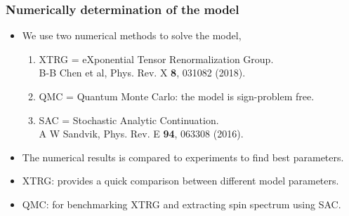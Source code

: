\documentclass[xcolor=table, aspectratio=1610,ignorenonframetext]{beamer}
\begin{document}
\begin{frame}
  \frametitle{Numerically determination of the model}
  \begin{itemize}
    \item<1-> We use two numerical methods to solve the model,
    \begin{enumerate}
      \item<2-> XTRG = eXponential Tensor Renormalization Group.\\
      B-B Chen et al, Phys. Rev. X \textbf{8}, 031082 (2018).
      \item<3-> QMC = Quantum Monte Carlo: the model is sign-problem free.
      \item<4-> SAC = Stochastic Analytic Continuation.\\
      A W Sandvik, Phys. Rev. E \textbf{94}, 063308 (2016).
    \end{enumerate}
    \item<5-> The numerical results is compared to experiments to find best parameters.
    \item<6-> XTRG: provides a quick comparison between different model parameters.
    \item<6-> QMC: for benchmarking XTRG and extracting spin spectrum using SAC.
  \end{itemize}

  \begin{center}
    ~~~~~~
  \end{center}
\end{frame}
\end{document}
